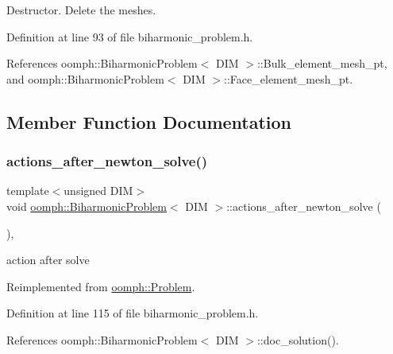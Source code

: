 Destructor. Delete the meshes. 



Definition at line 93 of file biharmonic\+\_\+problem.\+h.



References oomph\+::\+Biharmonic\+Problem$<$ D\+I\+M $>$\+::\+Bulk\+\_\+element\+\_\+mesh\+\_\+pt, and oomph\+::\+Biharmonic\+Problem$<$ D\+I\+M $>$\+::\+Face\+\_\+element\+\_\+mesh\+\_\+pt.



\subsection{Member Function Documentation}
\mbox{\label{classoomph_1_1BiharmonicProblem_ad685995c81201b8e5dfa7136e1858713}} 
\subsubsection{\texorpdfstring{actions\+\_\+after\+\_\+newton\+\_\+solve()}{actions\_after\_newton\_solve()}}
{\footnotesize\ttfamily template$<$unsigned D\+IM$>$ \\
void \hyperlink{classoomph_1_1BiharmonicProblem}{oomph\+::\+Biharmonic\+Problem}$<$ D\+IM $>$\+::actions\+\_\+after\+\_\+newton\+\_\+solve (\begin{DoxyParamCaption}{ }\end{DoxyParamCaption})\hspace{0.3cm}{\ttfamily [inline]}, {\ttfamily [virtual]}}



action after solve 



Reimplemented from \hyperlink{classoomph_1_1Problem_a033ec7301123deeb7e56d04c38f9f1da}{oomph\+::\+Problem}.



Definition at line 115 of file biharmonic\+\_\+problem.\+h.



References oomph\+::\+Biharmonic\+Problem$<$ D\+I\+M $>$\+::doc\+\_\+solution().

\mbox{\label{classoomph_1_1BiharmonicProblem_a161f8a00ca635684bfd54880925cd5bf}} 
